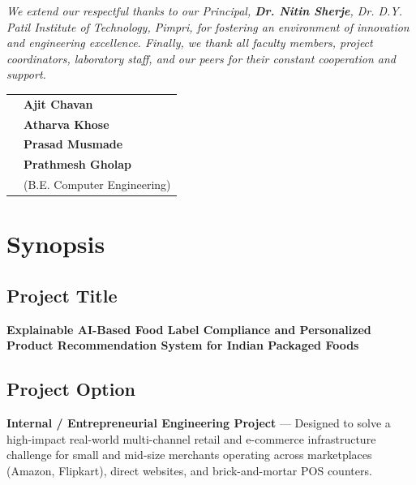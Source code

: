\documentclass[oneside,a4paper,12pt]{report}
\providecommand{\mainmatter}{\clearpage\pagenumbering{arabic}}
\newcommand{\ProjectTitleMixed}{Explainable AI-Based Food Label Compliance and Personalized Product Recommendation System for Indian Packaged Foods}
\newcommand{\PrincipalName}{Dr. Nitin Sherje}
\newcommand{\StudentOneName}{Ajit Chavan}
\newcommand{\StudentTwoName}{Atharva Khose}
\newcommand{\StudentThreeName}{Prasad Musmade}
\newcommand{\StudentFourName}{Prathmesh Gholap}
\begin{document}
\vspace*{1\baselineskip}
\textit{We extend our respectful thanks to our Principal, \textbf{\PrincipalName}, Dr. D.Y. Patil Institute of Technology, Pimpri, for fostering an environment of innovation and engineering excellence. Finally, we thank all faculty members, project coordinators, laboratory staff, and our peers for their constant cooperation and support.}

\vspace*{3\baselineskip}
\noindent
\begin{tabular}{p{8.2cm} l}
 & \textbf{\StudentOneName} \\[4pt]
 & \textbf{\StudentTwoName} \\[4pt]
 & \textbf{\StudentThreeName} \\[4pt]
 & \textbf{\StudentFourName} \\[6pt]
 & (B.E. Computer Engineering) \\
\end{tabular}

\newpage
\setlength{\parindent}{0mm}
\tableofcontents
\newpage
\listoffigures
\newpage
\listoftables

\mainmatter
\setlength{\parindent}{11mm}
\setlength{\parskip}{6pt plus 2pt minus 1pt}

\chapter{Synopsis}

\section{Project Title}
\textbf{\ProjectTitleMixed}

\section{Project Option}
\textbf{Internal / Entrepreneurial Engineering Project} — Designed to solve a high-impact real-world multi-channel retail and e-commerce infrastructure challenge for small and mid-size merchants operating across marketplaces (Amazon, Flipkart), direct websites, and brick-and-mortar POS counters.
\end{document}
